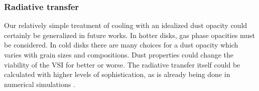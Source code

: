 %
%

\subsubsection{Radiative transfer} 
Our relatively simple treatment of cooling with an idealized dust opacity
could certainly be generalized in future works.  In hotter disks, gas phase opacities
must be considered.   In cold disks there are many choices for a dust opacity which 
varies with grain sizes and compositions. Dust properties could change the viability 
of the VSI for better or worse.  The radiative transfer itself
could be calculated with higher levels of sophistication, as is already being done in
numerical simulations \citep{stoll14}.



